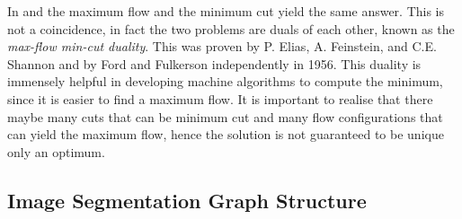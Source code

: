 In  and  the maximum flow and the minimum cut yield the same answer. This is not a coincidence, in fact the two problems are duals of each other, known as the \textit{max-flow min-cut duality}. This was proven by P. Elias, A. Feinstein, and C.E. Shannon \citep{Elias1956} and by Ford and Fulkerson \citep{Ford1956} independently in 1956. This duality is immensely helpful in developing machine algorithms to compute the minimum, since it is easier to find a maximum flow. It is important to realise that there maybe many cuts that can be minimum cut and many flow configurations that can yield the maximum flow, hence the solution is not guaranteed to be unique only an optimum.


\subsection{Image Segmentation Graph Structure}
\label{sec:GraphCutFramework}


